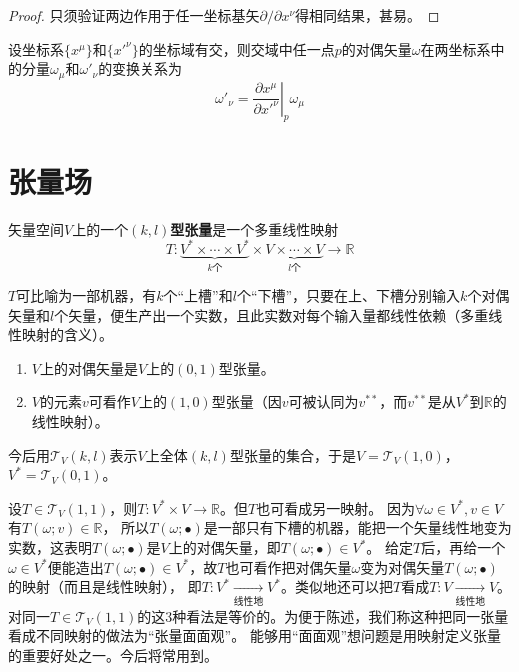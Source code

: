 \begin{proof}
只须验证两边作用于任一坐标基矢$\partial / \partial x^\nu$得相同结果，甚易。
\end{proof}

\begin{theorem}
设坐标系$\{x^\mu\}$和$\{x'^\nu\}$的坐标域有交，则交域中任一点$p$的对偶矢量$\omega$在两坐标系中的分量$\omega_\mu$和$\omega'_\nu$的变换关系为
$$\omega'_\nu = \left.\frac{\partial x^\mu}{\partial x'^\nu}\right|_p\omega_\mu$$
\end{theorem}

\section{张量场}

\begin{definition}
矢量空间$V$上的一个\textbf{$(k, l)$型张量}是一个多重线性映射
$$T \colon \underbrace{V^* \times \cdots \times V^*}_\text{$k$个} \times \underbrace{V \times \cdots \times V}_\text{$l$个} \to \mathbb{R}$$
\end{definition}

\begin{note}
$T$可比喻为一部机器，有$k$个``上槽''和$l$个``下槽''，只要在上、下槽分别输入$k$个对偶矢量和$l$个矢量，便生产出一个实数，且此实数对每个输入量都线性依赖（多重线性映射的含义）。
\end{note}

\begin{example}
\begin{enumerate}[（1）]
\item $V$上的对偶矢量是$V$上的$(0, 1)$型张量。
\item $V$的元素$v$可看作$V$上的$(1, 0)$型张量（因$v$可被认同为$v^{**}$，而$v^{**}$是从$V^*$到$\mathbb{R}$的线性映射）。
\end{enumerate}
\end{example}

今后用$\mathscr{T}_V(k, l)$表示$V$上全体$(k, l)$型张量的集合，于是$V = \mathscr{T}_V(1, 0)$，$V^* = \mathscr{T}_V(0, 1)$。

设$T \in \mathscr{T}_V(1, 1)$，则$T \colon V^* \times V \to \mathbb{R}$。但$T$也可看成另一映射。
因为$\forall \omega \in V^*, v \in V$有$T(\omega; v) \in \mathbb{R}$，
所以$T(\omega; \bullet)$是一部只有下槽的机器，能把一个矢量线性地变为实数，这表明$T(\omega; \bullet)$是$V$上的对偶矢量，即$T(\omega; \bullet) \in V^*$。
给定$T$后，再给一个$\omega \in V^*$便能造出$T(\omega; \bullet) \in V^*$，故$T$也可看作把对偶矢量$\omega$变为对偶矢量$T(\omega; \bullet)$的映射（而且是线性映射），
即$T \colon V^* \xrightarrow[\text{线性地}]{} V^*$。类似地还可以把$T$看成$T \colon V \xrightarrow[\text{线性地}]{} V$。
对同一$T \in \mathscr{T}_V(1, 1)$的这$3$种看法是等价的。为便于陈述，我们称这种把同一张量看成不同映射的做法为``张量面面观''。
能够用``面面观''想问题是用映射定义张量的重要好处之一。今后将常用到。

